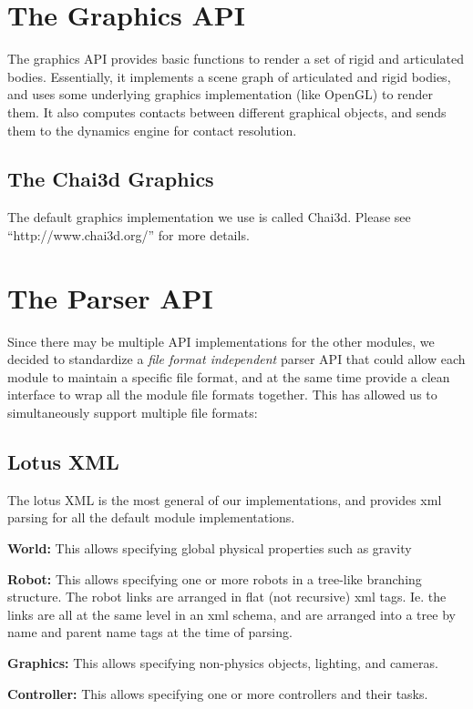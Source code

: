 \documentclass[12pt]{article}
\begin{document}
\section{The Graphics API}
The graphics API provides basic functions to render a set of rigid and articulated
bodies. Essentially, it implements a scene graph of articulated and rigid bodies, and
uses some underlying graphics implementation (like OpenGL) to render them.
It also computes contacts between different graphical objects, and sends them
to the dynamics engine for contact resolution.

\subsection{The Chai3d Graphics}
The default graphics implementation we use is called Chai3d. Please see ``http://www.chai3d.org/'' for more details.

\section{The Parser API}
Since there may be multiple API implementations for the other modules, we decided
to standardize a {\em file format independent} parser API that could allow each module
to maintain a specific file format, and at the same time provide a clean interface to
wrap all the module file formats together. This has allowed us to simultaneously 
support multiple file formats:

\subsection{Lotus XML}
The lotus XML is the most general of our implementations, and provides xml parsing
for all the default module implementations.
\begin{description}
  \item {\bf World: } This allows specifying global physical properties such as gravity
  \item {\bf Robot: } This allows specifying one or more robots in a tree-like 
branching structure. The robot links are arranged in flat (not recursive) xml tags. Ie.
the links are all at the same level in an xml schema, and are arranged into a tree
by name and parent name tags at the time of parsing.
  \item {\bf Graphics: } This allows specifying non-physics objects, lighting, and 
cameras.
  \item {\bf Controller: } This allows specifying one or more controllers and their tasks.
\end{description}
\end{document}
